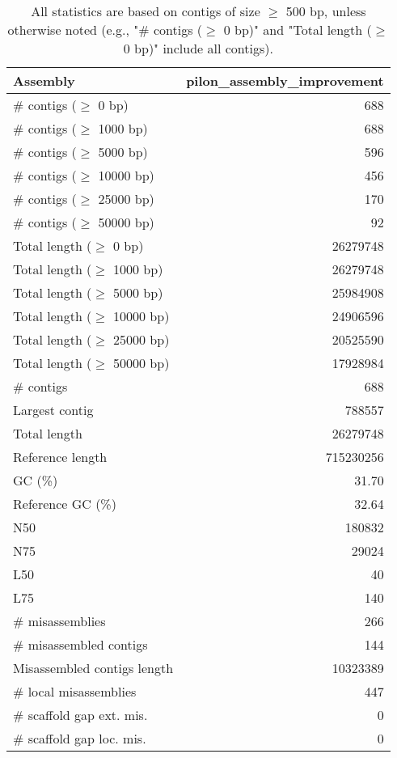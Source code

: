 \documentclass[12pt,a4paper]{article}
\begin{document}
\begin{table}[ht]
\begin{center}
\caption{All statistics are based on contigs of size $\geq$ 500 bp, unless otherwise noted (e.g., "\# contigs ($\geq$ 0 bp)" and "Total length ($\geq$ 0 bp)" include all contigs).}
\begin{tabular}{|l*{1}{|r}|}
\hline
Assembly & pilon\_assembly\_improvement \\ \hline
\# contigs ($\geq$ 0 bp) & 688 \\ \hline
\# contigs ($\geq$ 1000 bp) & 688 \\ \hline
\# contigs ($\geq$ 5000 bp) & 596 \\ \hline
\# contigs ($\geq$ 10000 bp) & 456 \\ \hline
\# contigs ($\geq$ 25000 bp) & 170 \\ \hline
\# contigs ($\geq$ 50000 bp) & 92 \\ \hline
Total length ($\geq$ 0 bp) & 26279748 \\ \hline
Total length ($\geq$ 1000 bp) & 26279748 \\ \hline
Total length ($\geq$ 5000 bp) & 25984908 \\ \hline
Total length ($\geq$ 10000 bp) & 24906596 \\ \hline
Total length ($\geq$ 25000 bp) & 20525590 \\ \hline
Total length ($\geq$ 50000 bp) & 17928984 \\ \hline
\# contigs & 688 \\ \hline
Largest contig & 788557 \\ \hline
Total length & 26279748 \\ \hline
Reference length & 715230256 \\ \hline
GC (\%) & 31.70 \\ \hline
Reference GC (\%) & 32.64 \\ \hline
N50 & 180832 \\ \hline
N75 & 29024 \\ \hline
L50 & 40 \\ \hline
L75 & 140 \\ \hline
\# misassemblies & 266 \\ \hline
\# misassembled contigs & 144 \\ \hline
Misassembled contigs length & 10323389 \\ \hline
\# local misassemblies & 447 \\ \hline
\# scaffold gap ext. mis. & 0 \\ \hline
\# scaffold gap loc. mis. & 0 \\ \hline

\end{tabular}
\end{center}
\end{table}
\end{document}
